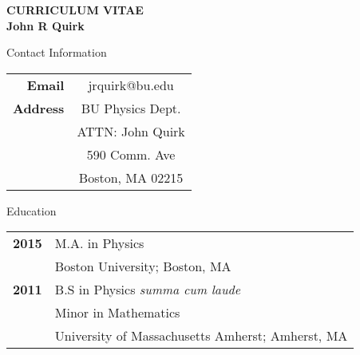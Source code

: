 
\thispagestyle{empty}

\begin{center}
{\LARGE {\bf CURRICULUM VITAE}}\\
\vspace{0.5in}
{\large {\bf John R Quirk}}
\end{center}


\begin{center}
{\large Contact Information}
\end{center}
\begin{tabular}{rc}
  {\bf Email}   & jrquirk@bu.edu\\
  {\bf Address} & BU Physics Dept.\\
                & ATTN: John Quirk\\
                & 590 Comm. Ave\\
                & Boston, MA 02215
\end{tabular}


\begin{center}
{\large Education}
\end{center}
\begin{tabular}{rl}
  {\bf 2015} & M.A. in Physics\\
             & Boston University; Boston, MA\\
  {\bf 2011} & B.S in Physics {\it summa cum laude}\\
             & Minor in Mathematics\\
             & University of Massachusetts Amherst; Amherst, MA
\end{tabular}


